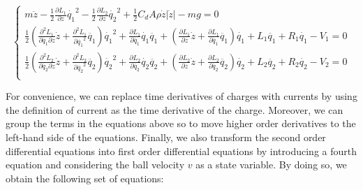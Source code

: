 \begin{equation}
    \begin{cases}
        m \ddot{z} - \frac{1}{2} \frac{\partial L_1}{\partial z} \dot{q_1}^2 - \frac{1}{2} \frac{\partial L_2}{\partial z} \dot{q_2}^2 + \frac{1}{2} C_d A \rho \dot{z} |\dot{z}| - m g = 0                                                                                                                                                                                                            \\
        \frac{1}{2} \left( \frac{\partial^2 L_1}{\partial \dot{q_1} \partial z} \dot{z} + \frac{\partial^2 L_1}{\partial \dot{q_1}^2} \ddot{q_1} \right) \dot{q_1}^2 + \frac{\partial L_1}{\partial \dot{q_1}} \dot{q_1} \ddot{q_1} + \left( \frac{\partial L_1}{\partial z} \dot{z} + \frac{\partial L_1}{\partial \dot{q_1}} \ddot{q_1} \right) \dot{q_1} + L_1 \ddot{q_1} + R_1 \dot{q_1} - V_1 = 0 \\
        \frac{1}{2} \left( \frac{\partial^2 L_2}{\partial \dot{q_2} \partial z} \dot{z} + \frac{\partial^2 L_2}{\partial \dot{q_2}^2} \ddot{q_2} \right) \dot{q_2}^2 + \frac{\partial L_2}{\partial \dot{q_2}} \dot{q_2} \ddot{q_2} + \left( \frac{\partial L_2}{\partial z} \dot{z} + \frac{\partial L_2}{\partial \dot{q_2}} \ddot{q_2} \right) \dot{q_2} + L_2 \ddot{q_2} + R_2 \dot{q_2} - V_2 = 0 \\
    \end{cases}
\end{equation}

For convenience, we can replace time derivatives of charges with currents by using the definition of current as the time derivative of the charge.
Moreover, we can group the terms in the equations above so to move higher order derivatives to the left-hand side of the equations.
Finally, we also transform the second order differential equations into first order differential equations by introducing a fourth equation and considering the ball velocity $v$ as a state variable.
By doing so, we obtain the following set of equations:


